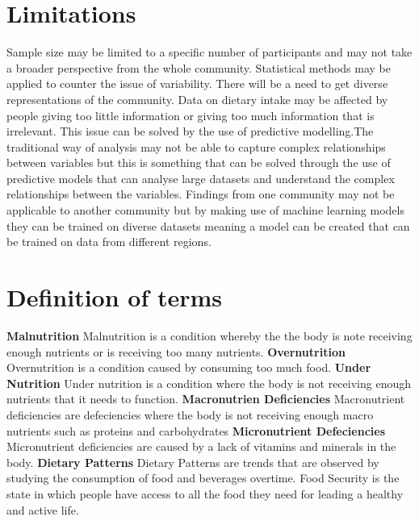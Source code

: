 \documentclass[a4paper,11pt]{report}
\begin{document}
	\section{Limitations}
Sample size may be limited to a specific number of participants and may not take a broader perspective from the whole community. Statistical methods may be applied to counter the issue of variability. There will be a need to get diverse representations of the community. Data on dietary intake may be affected by people giving too little information or giving too much information that is irrelevant. This issue can be solved by the use of predictive modelling.The traditional way of analysis may not be able to capture complex relationships between variables but this is something that can be solved through the use of predictive models that can analyse large datasets and understand the complex relationships between the variables. Findings from one community may not be applicable to another community but by making use of machine learning models they can be trained on diverse datasets meaning a model can be created that can be trained on data from different regions.
\section{Definition of terms}
\textbf{Malnutrition}\newline
	Malnutrition is a condition whereby the the body is note receiving enough nutrients or is receiving too many nutrients.\newline
	\textbf{Overnutrition}\newline
	Overnutrition is a condition caused by consuming too much food.\newline
	\textbf{Under Nutrition}\newline
	Under nutrition is a condition where the body is not receiving enough nutrients that it needs to function.\newline
	\textbf{Macronutrien Deficiencies}\newline
	Macronutrient deficiencies are defeciencies where the body is not receiving enough macro nutrients such as proteins and carbohydrates\newline
	\textbf{Micronutrient Defeciencies}\newline
	Micronutrient deficiencies  are caused by a lack of vitamins and minerals in the body.\newline
	\textbf{Dietary Patterns}\newline
	Dietary Patterns are trends that are observed by studying the consumption of food and beverages overtime.\newline
	\newline
	Food Security is the state in which people have access to all the food they need for leading a healthy and active life.
\end{document}
